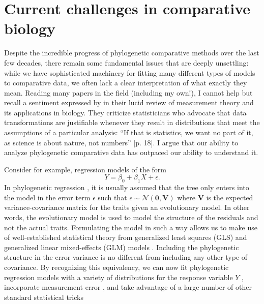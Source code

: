 \section{Current challenges in comparative biology}

Despite the incredible progress of phylogenetic comparative methods over the last few decades, there remain some fundamental issues that are deeply unsettling: while we have sophisticated machinery for fitting many different types of models to comparative data, we often lack a clear interpretation of what exactly they mean. Reading many papers in the field (including my own!), I cannot help but recall a sentiment expressed by \citet{Houle2011} in their lucid review of measurement theory and its applications in biology. They criticize statisticians who advocate that data transformations are justifiable whenever they result in distributions that meet the assumptions of a particular analysis: ``If that is statistics, we want no part of it, as science is about nature, not numbers'' [p. 18]. I argue that our ability to analyze phylogenetic comparative data has outpaced our ability to understand it.

Consider for example, regression models of the form
\[Y=\beta_0 + \beta_1X + \epsilon.\]
In phylogenetic regression \citep{Grafen1989, Lynch1991}, it is usually assumed that the tree only enters into the model in the error term $\epsilon$ such that $\epsilon \sim \mathcal{N}(\mathbf{0}, \mathbf{V})$ where $\mathbf{V}$ is the expected variance-covariance matrix for the traits given an evolutionary model. In other words, the evolutionary model is used to model the structure of the residuals and not the actual traits. Formulating the model in such a way allows us to make use of well-established statistical theory from generalized least squares (GLS) and generalized linear mixed-effects (GLM) models \citep{Lynch1991, Rohlf2001, Rohlf2006, Hadfield2010}. Including the phylogenetic structure in the error variance is no different from including any other type of covariance. By recognizing this equivalency, we can now fit phylogenetic regression models with a variety of distributions for the response variable $Y$ \citep{Ives2010, Hadfield2010}, incorporate measurement error \citep{Ives2007, Hansen2012SysBio}, and take advantage of a large number of other standard statistical tricks \citep[see][for a recent review]{PCM}

